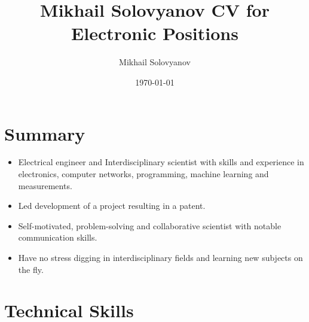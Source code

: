 \documentclass{article}
\title{ Mikhail Solovyanov CV for Electronic Positions}
\author{Mikhail Solovyanov}
\date{\today}
\begin{document}
 
 
\makecvtitle %
 
\section{Summary}
\begin{itemize}
\item  Electrical engineer and Interdisciplinary scientist with skills and experience in electronics, computer networks, programming, machine learning and measurements.
\item Led development of a  project resulting in a patent.
\item Self-motivated, problem-solving and collaborative scientist with notable communication skills.
\item Have no stress digging in interdisciplinary fields and learning new subjects on the fly.
\end{itemize}
 
\section{Technical Skills}
 
\end{document}
